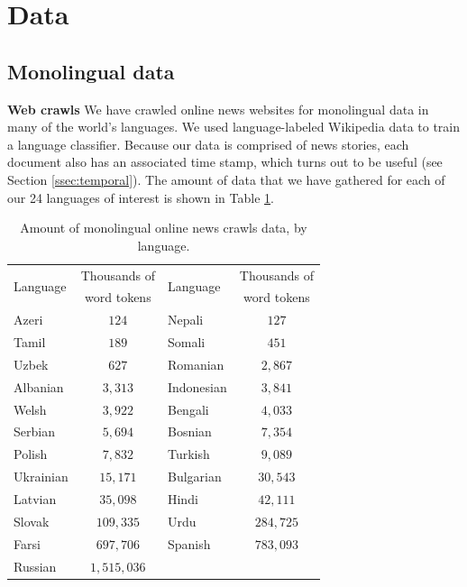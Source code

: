 \documentclass[11pt]{article}
\begin{document}
\section{Data}
\subsection{Monolingual data}
{\bf Web crawls} We have crawled online news websites for monolingual data in many of the world's languages. We used language-labeled Wikipedia data to train a language classifier. Because our data is comprised of news stories, each document also has an associated time stamp, which turns out to be useful (see Section \ref{ssec:temporal}). The amount of data that we have gathered for each of our 24 languages of interest is shown in Table \ref{table:crawls}.

\begin{table}\footnotesize
\begin{center}
\begin{tabular}{|l|c|l|c|}
\hline
\multirow{2}{*}{Language} & Thousands of & \multirow{2}{*}{Language} & Thousands of \\
&word tokens&&word tokens\\
\hline
Azeri & $124$ & Nepali & $127$ \\
Tamil & $189$ & Somali & $451$ \\
Uzbek & $627$ & Romanian & $2,867$ \\
Albanian & $3,313$ & Indonesian & $3,841$ \\
Welsh & $3,922$ & Bengali & $4,033$ \\
Serbian & $5,694$ & Bosnian & $7,354$ \\
Polish & $7,832$ & Turkish & $9,089$ \\
Ukrainian & $15,171$ & Bulgarian & $30,543$\\
Latvian & $35,098$ & Hindi & $42,111$ \\
Slovak & $109,335$ & Urdu & $284,725$\\
Farsi & $697,706$ & Spanish & $783,093$ \\
Russian & $1,515,036$ & &\\
\hline
\end{tabular}
\end{center}
\caption{\label{table:crawls}Amount of monolingual online news crawls data, by language.}
\end{table}
\end{document}
